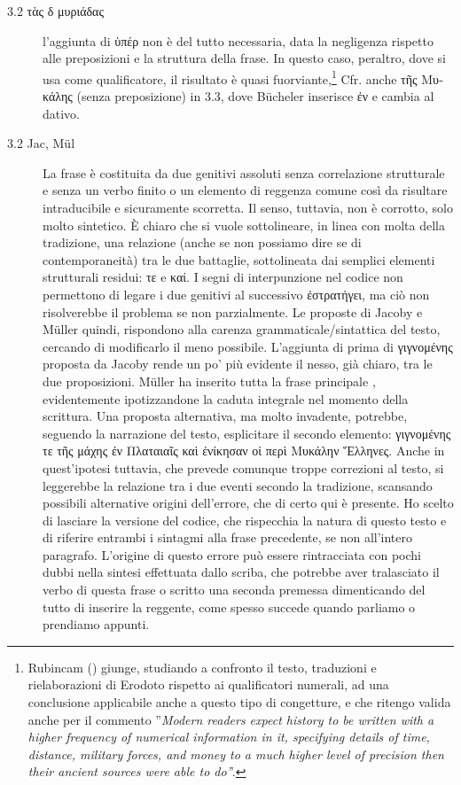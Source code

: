 \begin{description}
\item[3.2 \textgreek{τὰς δ μυριάδας}] l'aggiunta di  \textgreek{ὑπέρ} non è del tutto necessaria, data la negligenza rispetto alle preposizioni e la struttura della frase. In questo caso, peraltro, dove si usa come qualificatore, il risultato è quasi fuorviante,\footnote{Rubincam (\cite*[114]{Rubincam2008}) giunge, studiando a confronto il testo, traduzioni e rielaborazioni di Erodoto rispetto ai qualificatori numerali, ad una conclusione applicabile anche a questo tipo di congetture, e che ritengo valida anche per il commento ''\textit{Modern readers expect history to be written with a higher frequency of numerical information in it, specifying details of time, distance, military forces, and money to a much higher level of precision then their ancient sources were able to do'}'. } Cfr. anche \textgreek{τῆς Μυκάλης} (senza preposizione) in 3.3, dove Bücheler inserisce \textgreek{ἐν} e cambia al dativo.
\item[3.2 \textgreek{} Jac, \textgreek{} Mül]  La frase è costituita da due genitivi assoluti senza correlazione strutturale e senza un verbo finito o un elemento di reggenza comune così da risultare intraducibile e sicuramente scorretta. Il senso, tuttavia, non è corrotto, solo molto sintetico. È chiaro che si vuole sottolineare, in linea con molta della tradizione, una relazione (anche se non possiamo dire se di contemporaneità) tra le due battaglie, sottolineata dai semplici elementi strutturali residui: \textgreek{τε} e \textgreek{καί}. I segni di interpunzione nel codice non permettono di legare i due genitivi al successivo\textgreek{ ἐστρατήγει}, ma ciò non risolverebbe il problema se non parzialmente. Le proposte di Jacoby e Müller quindi, rispondono alla carenza grammaticale/sintattica del testo, cercando di modificarlo il meno possibile. L'aggiunta di \textgreek{} prima di \textgreek{γιγνομένης} proposta da Jacoby rende un po' più evidente il nesso, già chiaro, tra le due proposizioni. Müller ha inserito tutta la frase principale \textgreek{}, evidentemente ipotizzandone la caduta integrale nel momento della scrittura. Una proposta alternativa, ma molto invadente, potrebbe, seguendo la narrazione del testo, esplicitare il secondo elemento: \textgreek{γιγνομένης τε τῆς μάχης ἐν Πλαταιαῖς καὶ ἐνίκησαν οἱ περὶ Μυκάλην Ἕλληνες}. Anche in quest'ipotesi tuttavia, che prevede comunque troppe correzioni al testo, si leggerebbe la relazione tra i due eventi secondo la tradizione, scansando possibili alternative origini dell'errore, che di certo qui è presente. Ho scelto di lasciare la versione del codice, che rispecchia la natura di questo testo e di riferire entrambi i sintagmi alla frase precedente, se non all'intero paragrafo. L'origine di questo errore può essere rintracciata con pochi dubbi nella sintesi effettuata dallo scriba, che potrebbe aver tralasciato il verbo di questa frase o scritto una seconda premessa dimenticando del tutto di inserire la reggente, come spesso succede quando parliamo o prendiamo appunti.

\end{description}
